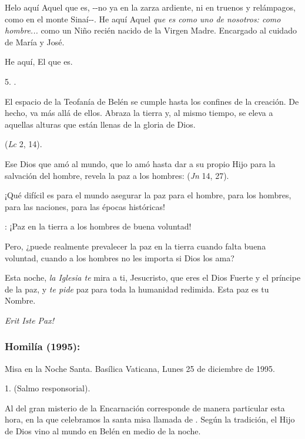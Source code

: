 \begin{body}
\begin{body}
		Helo aquí Aquel que es, -\/-no ya en la zarza ardiente, ni en truenos y relámpagos, como en el monte Sinaí-\/-. He aquí Aquel \emph{que es como uno de nosotros: como hombre...} como un Niño recién nacido de la Virgen Madre. Encargado al cuidado de María y José.
		
		He aquí, El que es.
		
		5. .
		
		El espacio de la Teofanía de Belén se cumple hasta los confines de la creación. De hecho, va más allá de ellos. Abraza la tierra y, al mismo tiempo, se eleva a aquellas alturas que están llenas de la gloria de Dios.
		
		 (\emph{Lc} 2, 14).
		
		Ese Dios que amó al mundo, que lo amó hasta dar a su propio Hijo para la salvación del hombre, revela la paz a los hombres:  (\emph{Jn} 14, 27).
		
		¡Qué difícil es para el mundo asegurar la paz para el hombre, para los hombres, para las naciones, para las épocas históricas!
		
		: ¡Paz en la tierra a los hombres de buena voluntad!
		
		Pero, ¿puede realmente prevalecer la paz en la tierra cuando falta buena voluntad, cuando a los hombres no les importa si Dios los ama?
		
		Esta noche, \emph{la Iglesia te} mira a ti, Jesucristo, que eres el Dios Fuerte y el príncipe de la paz, y \emph{te pide} paz para toda la humanidad redimida. Esta paz es tu Nombre.
		
		\emph{Erit Iste Pax!}
	\end{body}
	
	\subsubsection{Homilía (1995): } Misa en la Noche Santa. Basílica Vaticana, Lunes 25 de diciembre de 1995.
	
	\begin{body}
		1.  (Salmo responsorial).
		
		Al  del gran misterio de la Encarnación corresponde de manera particular esta hora, en la que celebramos la santa misa llamada de . Según la tradición, el Hijo de Dios vino al mundo en Belén en medio de la noche.
		

\end{body}
\end{body}
